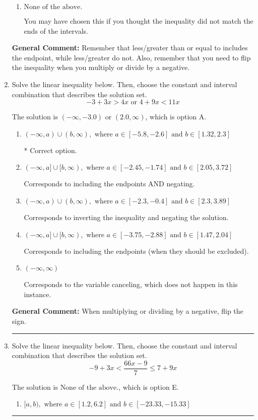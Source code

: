 \documentclass{extbook}[14pt]
\newcommand{\litem}[1]{\item #1

\rule{\textwidth}{0.4pt}}
\begin{document}
\begin{enumerate}
{\begin{enumerate}[label=\Alph*.]
 $(-\infty, -0.462]$, which corresponds to negating the endpoint of the solution.
\item \( \text{None of the above}. \)

You may have chosen this if you thought the inequality did not match the ends of the intervals.
\end{enumerate}

\textbf{General Comment:} Remember that less/greater than or equal to includes the endpoint, while less/greater do not. Also, remember that you need to flip the inequality when you multiply or divide by a negative.
}
\litem{
Solve the linear inequality below. Then, choose the constant and interval combination that describes the solution set.
\[ -3 + 3 x > 4 x \text{ or } 4 + 9 x < 11 x \]

The solution is \( (-\infty, -3.0) \text{ or } (2.0, \infty) \), which is option A.\begin{enumerate}[label=\Alph*.]
\item \( (-\infty, a) \cup (b, \infty), \text{ where } a \in [-5.8, -2.6] \text{ and } b \in [1.32, 2.3] \)

 * Correct option.
\item \( (-\infty, a] \cup [b, \infty), \text{ where } a \in [-2.45, -1.74] \text{ and } b \in [2.05, 3.72] \)

Corresponds to including the endpoints AND negating.
\item \( (-\infty, a) \cup (b, \infty), \text{ where } a \in [-2.3, -0.4] \text{ and } b \in [2.3, 3.89] \)

Corresponds to inverting the inequality and negating the solution.
\item \( (-\infty, a] \cup [b, \infty), \text{ where } a \in [-3.75, -2.88] \text{ and } b \in [1.47, 2.04] \)

Corresponds to including the endpoints (when they should be excluded).
\item \( (-\infty, \infty) \)

Corresponds to the variable canceling, which does not happen in this instance.
\end{enumerate}

\textbf{General Comment:} When multiplying or dividing by a negative, flip the sign.
}
\litem{
Solve the linear inequality below. Then, choose the constant and interval combination that describes the solution set.
\[ -9 + 3 x < \frac{66 x - 9}{7} \leq 7 + 9 x \]

The solution is \( \text{None of the above.} \), which is option E.\begin{enumerate}[label=\Alph*.]
\item \( [a, b), \text{ where } a \in [1.2, 6.2] \text{ and } b \in [-23.33, -15.33] \)


\end{enumerate}}
\end{enumerate}
\end{document}
